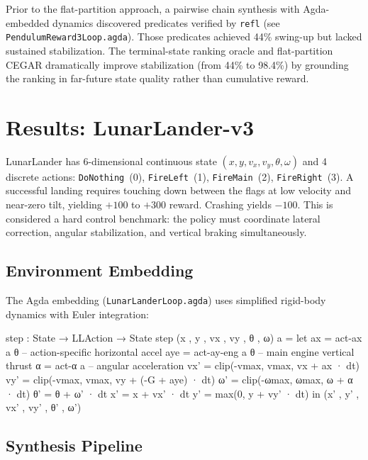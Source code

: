 \documentclass[9pt,a4paper]{article}
\newcommand{\fpath}[1]{\nolinkurl{#1}}
\theoremstyle{plain}
\theoremstyle{definition}
\theoremstyle{remark}
\begin{document}
Prior to the flat-partition approach, a pairwise chain synthesis
with Agda-embedded dynamics discovered predicates verified by
\texttt{refl} (see \fpath{PendulumReward3Loop.agda}). Those
predicates achieved 44\% swing-up but lacked sustained
stabilization. The terminal-state ranking oracle and flat-partition
CEGAR dramatically improve stabilization (from 44\% to 98.4\%)
by grounding the ranking in far-future state quality rather than
cumulative reward.

\section{Results: LunarLander-v3}
\label{sec:lunarlander}

LunarLander has 6-dimensional continuous state
$(x, y, v_x, v_y, \theta, \omega)$ and 4 discrete actions:
\texttt{DoNothing}~(0), \texttt{FireLeft}~(1),
\texttt{FireMain}~(2), \texttt{FireRight}~(3).
A successful landing requires touching down between the flags at
low velocity and near-zero tilt, yielding $+100$ to $+300$ reward.
Crashing yields $-100$. This is considered a hard control benchmark:
the policy must coordinate lateral correction, angular stabilization,
and vertical braking simultaneously.

\subsection{Environment Embedding}

The Agda embedding (\fpath{LunarLanderLoop.agda}) uses simplified
rigid-body dynamics with Euler integration:

\begin{spec}
step : State → LLAction → State
step (x , y , vx , vy , θ , ω) a =
  let ax  = act-ax a θ        -- action-specific horizontal accel
      aye = act-ay-eng a θ     -- main engine vertical thrust
      α   = act-α a            -- angular acceleration
      vx' = clip(-vmax, vmax, vx + ax · dt)
      vy' = clip(-vmax, vmax, vy + (-G + aye) · dt)
      ω'  = clip(-ωmax, ωmax, ω + α · dt)
      θ'  = θ + ω' · dt
      x'  = x + vx' · dt
      y'  = max(0, y + vy' · dt)
  in (x' , y' , vx' , vy' , θ' , ω')
\end{spec}

\subsection{Synthesis Pipeline}
\end{document}
